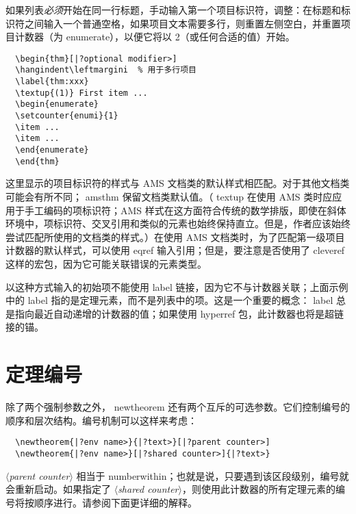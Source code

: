 \documentclass{article}
\newcommand{\ntt}{%
  \fontfamily\ttdefault \fontseries\mddefault \fontshape\updefault
  \selectfont
}
\DeclareRobustCommand{\cn}[1]{{\ntt\bslchar#1}}
\DeclareRobustCommand{\pkg}[1]{{\ntt#1}}
\DeclareRobustCommand{\env}[1]{{\ntt#1}}
\def\<#1>{{\normalfont$\langle$\textit{#1}$\rangle$}}
\begin{document}
如果列表\emph{必须}开始在同一行标题，手动输入第一个项目标识符，调整：在标题和标识符之间输入一个普通空格，如果项目文本需要多行，则重置左侧空白，并重置项目计数器（为 \env{enumerate}），以便它将以 2（或任何合适的值）开始。
\begin{verbatim}
  \begin{thm}[|?optional modifier>]
  \hangindent\leftmargini  % 用于多行项目
  \label{thm:xxx}
  \textup{(1)} First item ...
  \begin{enumerate}
  \setcounter{enumi}{1}
  \item ...
  \item ...
  \end{enumerate}
  \end{thm}
\end{verbatim}
这里显示的项目标识符的样式与 AMS 文档类的默认样式相匹配。对于其他文档类可能会有所不同；\pkg{amsthm} 保留文档类默认值。（\cn{textup} 在使用 AMS 类时应应用于手工编码的项标识符；AMS 样式在这方面符合传统的数学排版，即使在斜体环境中，项标识符、交叉引用和类似的元素也始终保持直立。但是，作者应该始终尝试匹配所使用的文档类的样式。）在使用 AMS 文档类时，为了匹配第一级项目计数器的默认样式，可以使用 \cn{eqref} 输入引用；但是，要注意是否使用了 \pkg{cleveref} 这样的宏包，因为它可能关联错误的元素类型。

以这种方式输入的初始项不能使用 \cn{label} 链接，因为它不与计数器关联；上面示例中的 \cn{label} 指的是定理元素，而不是列表中的项。这是一个重要的概念：\cn{label} 总是指向最近自动递增的计数器的值；如果使用 \pkg{hyperref} 包，此计数器也将是超链接的锚。




\enlargethispage{1\baselineskip} %

\section{定理编号}

除了两个强制参数之外，\cn{newtheorem} 还有两个互斥的可选参数。它们控制编号的顺序和层次结构。编号机制可以这样来考虑：
\begin{verbatim}
  \newtheorem{|?env name>}{|?text>}[|?parent counter>]
  \newtheorem{|?env name>}[|?shared counter>]{|?text>}
\end{verbatim}
\<parent counter> 相当于 \cn{numberwithin}；也就是说，只要遇到该区段级别，编号就会重新启动。如果指定了 \<shared counter>，则使用此计数器的所有定理元素的编号将按顺序进行。请参阅下面更详细的解释。
\end{document}

